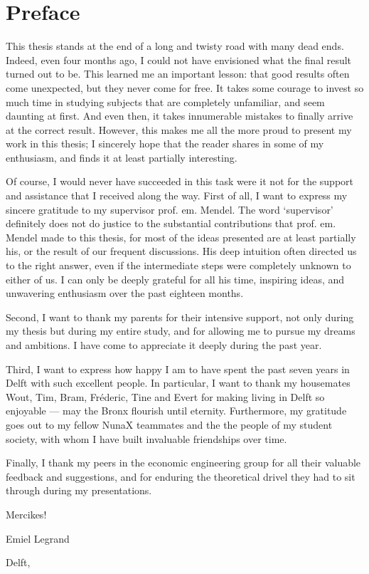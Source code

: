 \chapter{Preface}
\thispagestyle{empty}
This thesis stands at the end of a long and twisty road with many dead ends. Indeed, even four months ago, I could not have envisioned what the final result turned out to be. This learned me an important lesson: that good results often come unexpected, but they never come for free. It takes some courage to invest so much time in studying subjects that are completely unfamiliar, and seem daunting at first. And even then, it takes innumerable mistakes to finally arrive at the correct result. 
However, this makes me all the more proud to present my work in this thesis; I sincerely hope that the reader shares in some of my enthusiasm, and finds it at least partially interesting.

Of course, I would never have succeeded in this task were it not for the support and assistance that I received along the way. First of all, I want to express my sincere gratitude to my supervisor prof. em. Mendel. The word `supervisor' definitely does not do justice to the substantial contributions that prof. em. Mendel made to this thesis, for most of the ideas presented are at least partially his, or the result of our frequent discussions. His deep intuition often directed us to the right answer, even if the intermediate steps were completely unknown to either of us. I can only be deeply grateful for all his time, inspiring ideas, and unwavering enthusiasm over the past eighteen months. 

Second, I want to thank my parents for their intensive support, not only during my thesis but during my entire study, and for allowing me to pursue my dreams and ambitions. I have come to appreciate it deeply during the past year.

Third, I want to express how happy I am to have spent the past seven years in Delft with such excellent people. In particular, I want to thank my housemates Wout, Tim, Bram, Fréderic, Tine and Evert for making living in Delft so enjoyable --- may the Bronx flourish until eternity. Furthermore, my gratitude goes out to my fellow NunaX teammates and the the people of my student society, with whom I have built invaluable friendships over time.

Finally, I thank my peers in the economic engineering group for all their valuable feedback and suggestions, and for enduring the theoretical drivel they had to sit through during my presentations.

Mercikes!

\begin{flushright}
    Emiel Legrand
\end{flushright}
Delft, \mscdate



